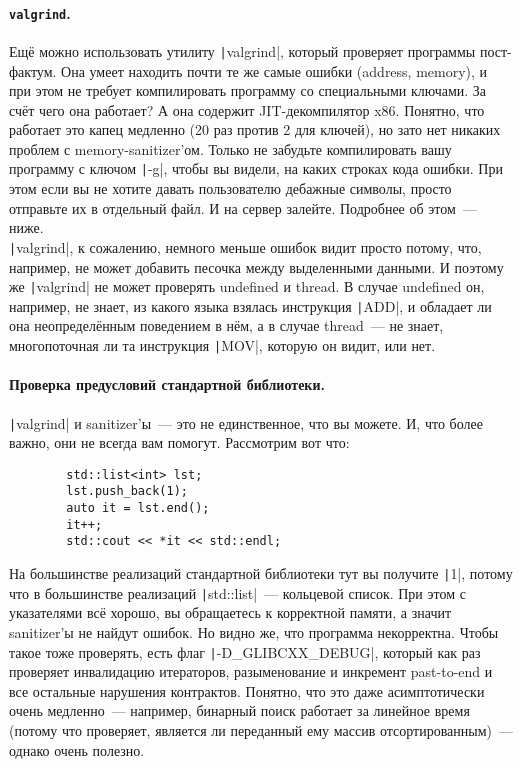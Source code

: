 \documentclass{article}
\begin{document}
    \paragraph{\texttt{valgrind}.}
    Ещё можно использовать утилиту \texttt|valgrind|, который проверяет программы пост-фактум. Она умеет находить почти те же самые ошибки (address, memory), и при этом не требует компилировать программу со специальными ключами. За счёт чего она работает? А она содержит JIT-декомпилятор x86. Понятно, что работает это капец медленно (20 раз против 2 для ключей), но зато нет никаких проблем с memory-sanitizer'ом. Только не забудьте компилировать вашу программу с ключом \texttt|-g|, чтобы вы видели, на каких строках кода ошибки. При этом если вы не хотите давать пользователю дебажные символы, просто отправьте их в отдельный файл. И на сервер залейте. Подробнее об этом~--- ниже.\\
    \texttt|valgrind|, к сожалению, немного меньше ошибок видит просто потому, что, например, не может добавить песочка между выделенными данными. И поэтому же \texttt|valgrind| не может проверять undefined и thread. В случае undefined он, например, не знает, из какого языка взялась инструкция \texttt|ADD|, и обладает ли она неопределённым поведением в нём, а в случае thread~--- не знает, многопоточная ли та инструкция \texttt|MOV|, которую он видит, или нет.
    \paragraph{Проверка предусловий стандартной библиотеки.}
    \texttt|valgrind| и sanitizer'ы~--- это не единственное, что вы можете. И, что более важно, они не всегда вам помогут. Рассмотрим вот что:
    \begin{verbatim}
        std::list<int> lst;
        lst.push_back(1);
        auto it = lst.end();
        it++;
        std::cout << *it << std::endl;
    \end{verbatim}
    На большинстве реализаций стандартной библиотеки тут вы получите \texttt|1|, потому что в большинстве реализаций \texttt|std::list|~--- кольцевой список. При этом с указателями всё хорошо, вы обращаетесь к корректной памяти, а значит sanitizer'ы не найдут ошибок. Но видно же, что программа некорректна. Чтобы такое тоже проверять, есть флаг \texttt|-D_GLIBCXX_DEBUG|, который как раз проверяет инвалидацию итераторов, разыменование и инкремент past-to-end и все остальные нарушения контрактов. Понятно, что это даже асимптотически очень медленно~--- например, бинарный поиск работает за линейное время (потому что проверяет, является ли переданный ему массив отсортированным)~--- однако очень полезно.
\end{document}
